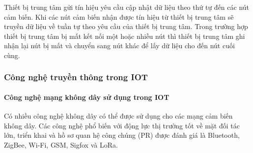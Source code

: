 \documentclass{article} %
\begin{document}
\begin{itemize}
		Thiết bị trung tâm gửi tín hiệu yêu cầu cập nhật dữ liệu theo thứ tự đến các nút cảm biến. Khi các nút cảm biến nhận được tín hiệu từ thiết bị trung tâm sẽ truyền dữ liệu về tuần  tự theo yêu cầu của thiết bị trung tâm. Trong trường hợp thiết bị trung tâm bị mất kết nối một hoặc nhiều nút thì thiết bị trung tâm ghi nhận lại nút bị mất và chuyển sang nút khác để lấy dữ liệu cho đến nút cuối cùng.    
	\end{itemize}
	
	
	\subsubsection{Công nghệ truyền thông trong IOT}
	
	\paragraph{Công nghệ mạng không dây sử dụng trong IOT}\mbox{}
	
	Có nhiều công nghệ không dây có thể được sử dụng cho các mạng cảm biến không dây. Các công nghệ phổ biến với động lực thị trường tốt về mặt đối tác lớn, triển khai và hồ sơ quan hệ công chúng (PR) được đánh giá là Bluetooth, ZigBee, Wi-Fi, GSM, Sigfox và LoRa.
	
\end{document}
